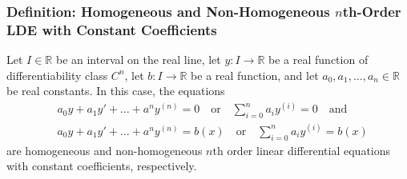 \documentclass[11pt, a4paper]{article}
\newcommand{\R}{\mathbb{R}} %
\begin{document}
\subsubsection{Definition: Homogeneous and Non-Homogeneous $ n $th-Order LDE with Constant Coefficients}
Let $ I \in \R $ be an interval on the real line, let $ y: I \to \R $ be a real function of differentiability class $ C^n $, let $ b: I \to \R $ be a real function, and let $ a_0, a_1, \dots, a_n \in \R$ be real constants. In this case, the equations
\begin{align*}
	& a_0 y + a_1 y' + \dots + a^{n}y^{(n)} = 0 \quad \text{or} \quad \sum_{i=0}^{n}a_{i}y^{(i)} = 0 \quad \text{and}\\[1.0ex]
	& a_0 y + a_1 y' + \dots + a^{n}y^{(n)} = b(x) \quad \text{or} \quad \sum_{i=0}^{n}a_{i}y^{(i)} = b(x)
\end{align*}
are homogeneous and non-homogeneous $ n $th order linear differential equations with constant coefficients, respectively.
\end{document}
